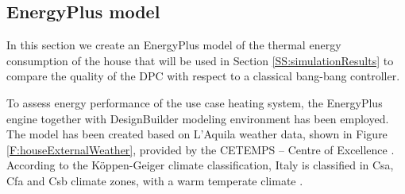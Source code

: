 \subsection{EnergyPlus model}\label{SS:energyPlusmodel}
In this section we create an EnergyPlus model of the thermal energy consumption of the house that will be used in Section \ref{SS:simulationResults} to compare the quality of the DPC with respect to a classical bang-bang controller.

To assess energy performance of the use case heating system, the EnergyPlus engine \cite{energyPlus} together with DesignBuilder modeling environment \cite{designBuilder} has been employed. The model has been created based  on L'Aquila weather data, shown in Figure \ref{F:houseExternalWeather}, provided by the CETEMPS – Centre of Excellence \cite{CETEMPS}. According to the K\"{o}ppen-Geiger climate classification, Italy is classified in Csa, Cfa and Csb climate zones, with a warm temperate climate \cite{Peel2007}.

